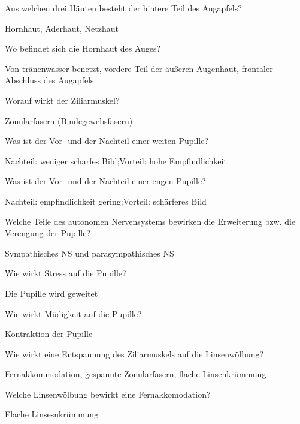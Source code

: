 \documentclass[10pt, a4paper]{exam}
\begin{document}
\begin{questions}
  \question Aus welchen drei Häuten besteht der hintere Teil des Augapfels?
  \begin{solution}
    Hornhaut, Aderhaut, Netzhaut
  \end{solution}

  \question Wo befindet sich die Hornhaut des Auges?
  \begin{solution}
    Von tränenwasser benetzt, vordere Teil der äußeren Augenhaut, frontaler Abschluss des Augapfels
  \end{solution}

  \question Worauf wirkt der Ziliarmuskel?
  \begin{solution}
    Zonularfasern (Bindegewebsfasern)
  \end{solution}

  \question Was ist der Vor- und der Nachteil einer weiten Pupille?
  \begin{solution}
    Nachteil: weniger scharfes Bild;\quad Vorteil: hohe Empfindlichkeit
  \end{solution}

  \question Was ist der Vor- und der Nachteil einer engen Pupille?
  \begin{solution}
    Nachteil: empfindlichkeit gering;\quad Vorteil: schärferes Bild
  \end{solution}

  \question Welche Teile des autonomen Nervensystems bewirken die Erweiterung bzw. die Verengung der Pupille?
  \begin{solution}
    Sympathisches NS und parasympathisches NS
  \end{solution}

  \question Wie wirkt Stress auf die Pupille?
  \begin{solution}
    Die Pupille wird geweitet
  \end{solution}

  \question Wie wirkt Müdigkeit auf die Pupille?
  \begin{solution}
    Kontraktion der Pupille
  \end{solution}

  \question Wie wirkt eine Entspannung des Ziliarmuskels auf die Linsenwölbung?
  \begin{solution}
    Fernakkommodation, gespannte Zonularfasern, flache Linsenkrümmung
  \end{solution}

  \question Welche Linsenwölbung bewirkt eine Fernakkomodation?
  \begin{solution}
    Flache Linsesnkrümmung
  \end{solution}


\end{questions}
\end{document}

